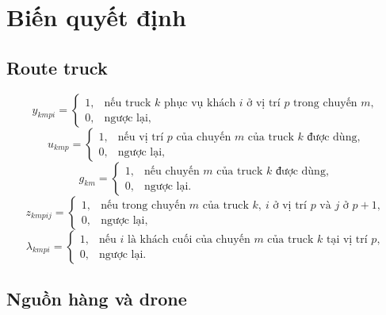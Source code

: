 \documentclass[12pt,a4paper]{article}
\begin{document}
\section{Biến quyết định}

\subsection{Route truck}

\[
y_{kmpi}=
\begin{cases}
1, & \text{nếu truck }k\text{ phục vụ khách }i\text{ ở vị trí }p
\text{ trong chuyến }m,\\
0, & \text{ngược lại,}
\end{cases}
\]
\[
u_{kmp}=
\begin{cases}
1, & \text{nếu vị trí }p\text{ của chuyến }m\text{ của truck }k\text{ được dùng,}\\
0, & \text{ngược lại,}
\end{cases}
\]
\[
g_{km}=
\begin{cases}
1, & \text{nếu chuyến }m\text{ của truck }k\text{ được dùng,}\\
0, & \text{ngược lại.}
\end{cases}
\]
\[
z_{kmpij}=
\begin{cases}
1, & \text{nếu trong chuyến }m\text{ của truck }k,\ i\text{ ở vị trí }p
\text{ và }j\text{ ở }p+1,\\
0, & \text{ngược lại,}
\end{cases}
\]
\[
\lambda_{kmpi}=
\begin{cases}
1, & \text{nếu }i\text{ là khách cuối của chuyến }m\text{ của truck }k
\text{ tại vị trí }p,\\
0, & \text{ngược lại.}
\end{cases}
\]

\subsection{Nguồn hàng và drone}
\end{document}
